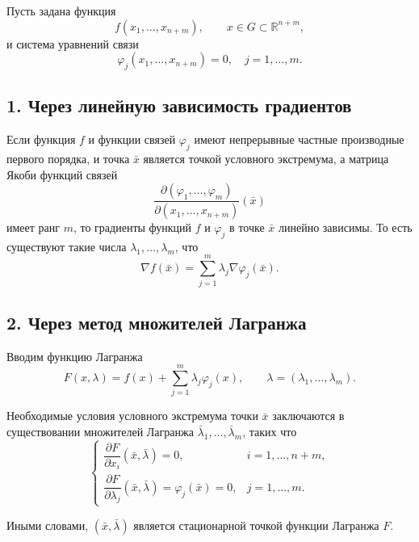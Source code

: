 \documentclass{article}
\begin{document}
Пусть задана функция
\[
f(x_1,\dots,x_{n+m}), \qquad x \in G \subset \mathbb{R}^{n+m},
\]
и система уравнений связи
\[
\varphi_j(x_1,\dots,x_{n+m}) = 0, \quad j=1,\dots,m.
\]

\subsection*{1. Через линейную зависимость градиентов}

Если функция $f$ и функции связей $\varphi_j$ имеют непрерывные частные производные первого порядка,  
и точка $\bar{x}$ является точкой условного экстремума,  
а матрица Якоби функций связей
\[
\frac{\partial(\varphi_1,\dots,\varphi_m)}{\partial(x_1,\dots,x_{n+m})}(\bar{x})
\]
имеет ранг $m$, то градиенты функций $f$ и $\varphi_j$ в точке $\bar{x}$ линейно зависимы.  
То есть существуют такие числа $\lambda_1,\dots,\lambda_m$, что
\[
\nabla f(\bar{x}) = \sum_{j=1}^{m} \lambda_j \nabla \varphi_j(\bar{x}).
\]

\subsection*{2. Через метод множителей Лагранжа}

Вводим функцию Лагранжа
\[
F(x,\lambda) = f(x) + \sum_{j=1}^{m} \lambda_j \varphi_j(x), \qquad \lambda = (\lambda_1,\dots,\lambda_m).
\]

Необходимые условия условного экстремума точки $\bar{x}$ заключаются в существовании множителей Лагранжа $\bar{\lambda}_1,\dots,\bar{\lambda}_m$, таких что
\[
\begin{cases}
\dfrac{\partial F}{\partial x_i}(\bar{x},\bar{\lambda}) = 0, & i=1,\dots,n+m,\\[2mm]
\dfrac{\partial F}{\partial \lambda_j}(\bar{x},\bar{\lambda}) = \varphi_j(\bar{x}) = 0, & j=1,\dots,m.
\end{cases}
\]

Иными словами, $(\bar{x},\bar{\lambda})$ является стационарной точкой функции Лагранжа $F$.
\end{document}
